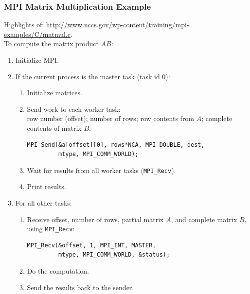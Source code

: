 \begin{frame}[fragile]
  \frametitle{MPI Matrix Multiplication Example}

 Highlights of:
   {\scriptsize \url{http://www.nccs.gov/wp-content/training/mpi-examples/C/matmul.c}}.\\
  

  To compute the matrix product $AB$:
\begin{enumerate}
\item Initialize MPI.
\item If the current process is the master task (task id 0):
\begin{enumerate}
\item Initialize matrices.
\item Send work to each worker task: \\
row number (offset); number of rows;
row contents from $A$; complete contents of matrix $B$.

{\scriptsize
\begin{verbatim}
MPI_Send(&a[offset][0], rows*NCA, MPI_DOUBLE, dest, 
         mtype, MPI_COMM_WORLD);
\end{verbatim}
}

\item Wait for results from all worker tasks (\verb+MPI_Recv+).
\item Print results.
\end{enumerate}
\item For all other tasks:
\begin{enumerate}
\item Receive offset, number of rows, partial matrix $A$, and complete matrix $B$, using {\tt MPI\_Recv}:

{\scriptsize
\begin{verbatim}
MPI_Recv(&offset, 1, MPI_INT, MASTER, 
         mtype, MPI_COMM_WORLD, &status);
\end{verbatim}
}
\item Do the computation.
\item Send the results back to the sender.
\end{enumerate}
\end{enumerate}
  
\end{frame}

